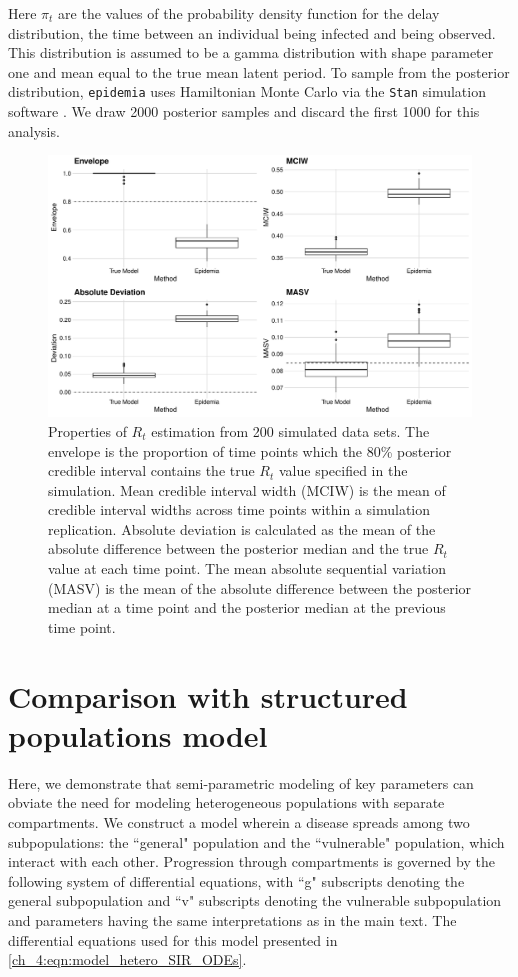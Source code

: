 Here $\pi_{t}$ are the values of the probability density function for the delay distribution, the time between an individual being infected and being observed.
This distribution is assumed to be a gamma distribution with shape parameter one and mean equal to the true mean latent period. 
To sample from the posterior distribution, \texttt{epidemia} uses Hamiltonian Monte Carlo via the \texttt{Stan} simulation software \citep{rstan}.
We draw 2000 posterior samples and discard the first 1000 for this analysis.


\begin{figure}[htbp]
    \centering
    \includegraphics[width=1.0\columnwidth]{rt_comparison_metrics_plot}
    \caption{Properties of \( R_t \) estimation from 200 simulated data sets.
    The envelope is the proportion of time points which the 80\% posterior credible interval contains the true \( R_t \) value specified in the simulation.
    Mean credible interval width (MCIW) is the mean of credible interval widths across time points within a simulation replication.
    Absolute deviation is calculated as the mean of the absolute difference between the posterior median and the true \( R_t \) value at each time point.
    The mean absolute sequential variation (MASV) is the mean of the absolute difference between the posterior median at a time point and the posterior median at the previous time point.}
    \label{ch_4:fig:rt_comparison_metrics_plot}
\end{figure}

\section{Comparison with structured populations model}
\label{ch_4:sec:hetero}
Here, we demonstrate that semi-parametric modeling of key parameters can obviate the need for modeling heterogeneous populations with separate compartments.
We construct a model wherein a disease spreads among two subpopulations: the ``general" population and the ``vulnerable" population, which interact with each other.
Progression through compartments is governed by the following system of differential equations, with ``g" subscripts denoting the general subpopulation and ``v" subscripts denoting the vulnerable subpopulation and parameters having the same interpretations as in the main text.
The differential equations used for this model presented in \eqref{ch_4:eqn:model_hetero_SIR_ODEs}.

